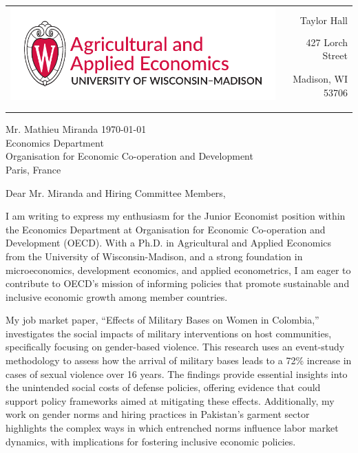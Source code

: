 \documentclass[12pt]{letter}
\begin{document}
\begin{tabularx}{\textwidth}{Xr}
\multirow{4}{*}{\includegraphics[height=3\baselineskip]{logo_cropped.pdf}} &  \\
& Taylor Hall \\
& 427 Lorch Street \\
& Madison, WI 53706 \\
[-1.8ex]\\
\\
\end{tabularx}

Mr. Mathieu Miranda \hfill \today \\
Economics Department \\
Organisation for Economic Co-operation and Development \\
Paris, France

\medskip

Dear Mr. Miranda and Hiring Committee Members,

I am writing to express my enthusiasm for the Junior Economist position within the Economics Department at Organisation for Economic Co-operation and Development (OECD). 
With a Ph.D. in Agricultural and Applied Economics from the University of Wisconsin-Madison, and a strong foundation in microeconomics, development economics, and applied econometrics, 
I am eager to contribute to OECD's mission of informing policies that promote sustainable and inclusive economic growth among member countries.

My job market paper, “Effects of Military Bases on Women in Colombia,” investigates the social impacts of military interventions on host communities, 
specifically focusing on gender-based violence. This research uses an event-study methodology to assess how the arrival of military bases leads to 
a 72\% increase in cases of sexual violence over 16 years. The findings provide essential insights into the unintended social costs of defense policies, offering evidence that could support policy frameworks aimed at mitigating these effects. 
Additionally, my work on gender norms and hiring practices in Pakistan's garment sector highlights the complex ways in which entrenched norms influence labor market dynamics, with implications for fostering inclusive economic policies.
\end{document}
